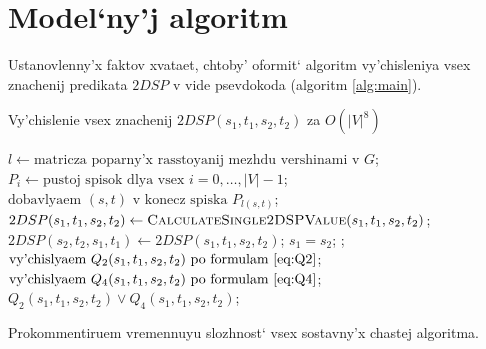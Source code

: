 \section{Model`ny'j algoritm}

Ustanovlenny'x faktov xvataet, chtoby' oformit` algoritm vy'chisleniya vsex znachenij predikata $2DSP$ v vide psevdokoda (algoritm \ref{alg:main}). 

\begin{algorithm}
\caption{Vy'chislenie vsex znachenij $2DSP(s_1, t_1, s_2, t_2)$ za $O(|V|^8)$} \label{alg:main}
\begin{algorithmic}[1]
\State $l \gets \text{matricza poparny'x rasstoyanij mezhdu vershinami v }G$; \label{line:floyd}
\State $P_i \gets \text{pustoj spisok dlya vsex }i = 0, \ldots, |V|-1$;
    \State $\text{dobavlyaem }(s, t)\text{ v konecz spiska }P_{l(s, t)}$;
\EndFor
{}
                \State $2DSP(s_1, t_1, s_2, t_2) \gets \textsc{CalculateSingle2DSPValue}(s_1, t_1, s_2, t_2)$;
                \State $2DSP(s_2, t_2, s_1, t_1) \gets 2DSP(s_1, t_1, s_2, t_2)$; 
            \EndFor
        \EndFor
    \EndFor
\EndFor
\EndProcedure
\Statex
{}
    \State \Return $s_1 = s_2$; \label{line:a}
    \State {}; \label{line:b}
\Else
    \State $\text{vy'chislyaem }Q_2(s_1, t_1, s_2, t_2)\text{ po formulam \eqref{eq:Q2}}$; \label{line:cQ2}
    \State $\text{vy'chislyaem }Q_4(s_1, t_1, s_2, t_2)\text{ po formulam \eqref{eq:Q4}}$; \label{line:cQ4}
    \State \Return $Q_2(s_1, t_1, s_2, t_2) \vee Q_4(s_1, t_1, s_2, t_2)$;
\EndIf
\EndProcedure
\end{algorithmic}
\end{algorithm}

Prokommentiruem vremennuyu slozhnost` vsex sostavny'x chastej algoritma.

